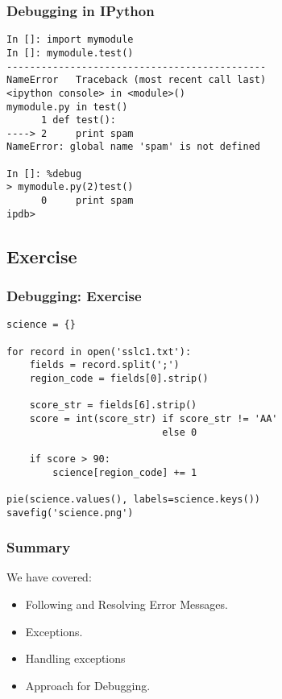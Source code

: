 \documentclass[compress,14pt]{beamer}
\newcounter{time}
\newcommand{\inctime}[1]{\addtocounter{time}{#1}{\vspace*{0.1in}\tiny \thetime\ m}}
\begin{document}
\begin{frame}[fragile]
\frametitle{Debugging in IPython}
\small
\begin{lstlisting}
In []: import mymodule
In []: mymodule.test()
---------------------------------------------
NameError   Traceback (most recent call last)
<ipython console> in <module>()
mymodule.py in test()
      1 def test():
----> 2     print spam
NameError: global name 'spam' is not defined

In []: %debug
> mymodule.py(2)test()
      0     print spam
ipdb> 
\end{lstlisting}
\inctime{15} 
\end{frame}

\subsection{Exercise}
\begin{frame}[fragile]
\frametitle{Debugging: Exercise}
\small
\begin{lstlisting}
science = {}

for record in open('sslc1.txt'):
    fields = record.split(';')
    region_code = fields[0].strip()

    score_str = fields[6].strip()
    score = int(score_str) if score_str != 'AA' 
                           else 0

    if score > 90:
        science[region_code] += 1

pie(science.values(), labels=science.keys())
savefig('science.png')
\end{lstlisting}
\inctime{10}
\end{frame}

\begin{frame}
  \frametitle{Summary}
We have covered:
  \begin{itemize}
  \item Following and Resolving Error Messages.
  \item Exceptions.
  \item Handling exceptions
  \item Approach for Debugging.
  \end{itemize}
\end{frame}
\end{document}

